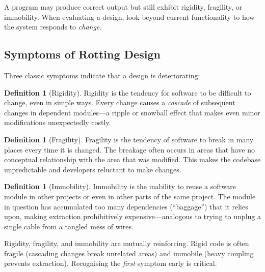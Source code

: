 \documentclass[11pt, a4paper, notitlepage]{report}
\theoremstyle{definition}
\newtheorem{definition}[theorem]{Definition}
\theoremstyle{remark}
\theoremstyle{definition}
\begin{document}
\begin{examtip}[title={Exam Tip: ``Working'' $\neq$ ``Well-Designed''}]
  A program may produce correct output but still exhibit rigidity, fragility, or
  immobility. When evaluating a design, look beyond current functionality to
  how the system responds to \emph{change}.
\end{examtip}

\subsection{Symptoms of Rotting Design}
\label{subsec:ch9-rot-symptoms}

Three classic symptoms indicate that a design is deteriorating:

\begin{definition}[Rigidity]
\label{def:ch9-rigidity}
Rigidity is the tendency for software to be difficult to change, even in simple
ways. Every change causes a \emph{cascade} of subsequent changes in dependent
modules---a ripple or snowball effect that makes even minor modifications
unexpectedly costly.
\end{definition}

\begin{definition}[Fragility]
\label{def:ch9-fragility}
Fragility is the tendency of software to break in many places every time it is
changed. The breakage often occurs in areas that have no conceptual relationship
with the area that was modified. This makes the codebase unpredictable and
developers reluctant to make changes.
\end{definition}

\begin{definition}[Immobility]
\label{def:ch9-immobility}
Immobility is the inability to reuse a software module in other projects or even
in other parts of the same project. The module in question has accumulated too
many dependencies (``baggage'') that it relies upon, making extraction prohibitively
expensive---analogous to trying to unplug a single cable from a tangled mess of wires.
\end{definition}

\begin{warning}[title={Warning: Design Rot Compounds}]
  Rigidity, fragility, and immobility are mutually reinforcing. Rigid code is often
  fragile (cascading changes break unrelated areas) and immobile (heavy coupling
  prevents extraction). Recognising the \emph{first} symptom early is critical.
\end{warning}
\end{document}
